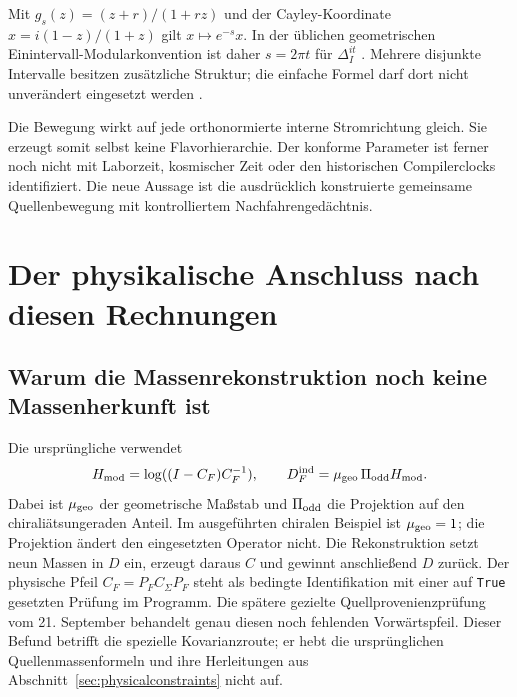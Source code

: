 
Mit $g_s(z)=(z+r)/(1+rz)$ und der Cayley-Koordinate $x=i(1-z)/(1+z)$ gilt $x\mapsto e^{-s}x$. In der üblichen geometrischen Einintervall-Modularkonvention ist daher $s=2\pi t$ für $\Delta_I^{it}$ \cite{cklw}. Mehrere disjunkte Intervalle besitzen zusätzliche Struktur; die einfache Formel darf dort nicht unverändert eingesetzt werden \cite{longomodular}.

Die Bewegung wirkt auf jede orthonormierte interne Stromrichtung gleich. Sie erzeugt somit selbst keine Flavorhierarchie. Der konforme Parameter ist ferner noch nicht mit Laborzeit, kosmischer Zeit oder den historischen Compilerclocks identifiziert. Die neue Aussage ist die ausdrücklich konstruierte gemeinsame Quellenbewegung mit kontrolliertem Nachfahrengedächtnis.

\section{Der physikalische Anschluss nach diesen Rechnungen}\label{sec:physicalfollow}


\subsection{Warum die Massenrekonstruktion noch keine Massenherkunft ist}
Die ursprüngliche  verwendet
\begin{equation}
H_{\rm mod}=\log((I-C_F)C_F^{-1}),\qquad
D_F^{\rm ind}=\mu_{\rm geo}\,\Pi_{\rm odd}H_{\rm mod}.
\end{equation}
Dabei ist $\mu_{\rm geo}$ der geometrische Maßstab und $\Pi_{\rm odd}$ die Projektion auf den chiraliätsungeraden Anteil. Im ausgeführten chiralen Beispiel ist $\mu_{\rm geo}=1$; die Projektion ändert den eingesetzten Operator nicht. Die Rekonstruktion setzt neun Massen in $D$ ein, erzeugt daraus $C$ und gewinnt anschließend $D$ zurück. Der physische Pfeil $C_F=P_FC_\Sigma P_F$ steht als bedingte Identifikation mit einer auf \texttt{True} gesetzten Prüfung im Programm. Die spätere gezielte Quellprovenienzprüfung vom 21. September behandelt genau diesen noch fehlenden Vorwärtspfeil. Dieser Befund betrifft die spezielle Kovarianzroute; er hebt die ursprünglichen Quellenmassenformeln und ihre Herleitungen aus Abschnitt~\ref{sec:physicalconstraints} nicht auf.

